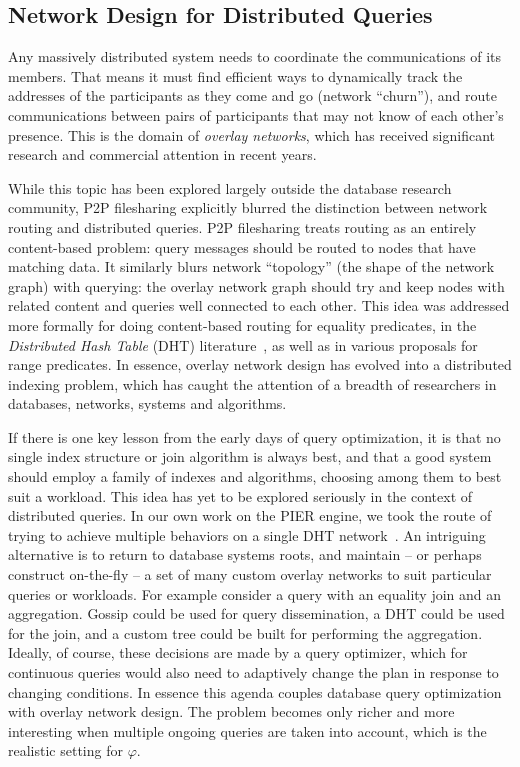 \documentclass{acm_proc_article-sp}
\def\philogo{{\large $\varphi$}\xspace}
\begin{document}
\subsection{Network Design for Distributed Queries} Any massively distributed system needs to coordinate the communications of its members. That means it must find efficient ways to dynamically track the addresses of the participants as they come and go (network ``churn''), and route communications between pairs of participants that may not know of each other's presence. This is the domain of {\em overlay networks}, which has received significant research and commercial attention in recent years.

While this topic has been explored largely outside the database research
community, P2P filesharing explicitly blurred the distinction between
network routing and distributed queries. P2P filesharing treats routing
as an entirely content-based problem: query messages should be routed to
nodes that have matching data. It similarly blurs network ``topology''
(the shape of the network graph) with querying: the overlay network
graph should try and keep nodes with related content and queries well
connected to each other. This idea was addressed more formally for doing
content-based routing for equality predicates, in the {\em Distributed
  Hash Table} (DHT) literature~\cite{Stoica2003,CAN,Bamboo}, as well as in various proposals for range predicates. In essence, overlay network design has evolved into a distributed indexing problem, which has caught the attention of a breadth of researchers in databases, networks, systems and algorithms.

If there is one key lesson from the early days of query optimization, it is that no single index structure or join algorithm is always best, and that a good system should employ a family of indexes and algorithms, choosing among them to best suit a workload. This idea has yet to be explored seriously in the context of distributed queries. In our own work on the PIER engine, we took the route of trying to achieve multiple behaviors on a single DHT network~\cite{pier-cidr}. An intriguing alternative is to return to database systems roots, and maintain -- or perhaps construct on-the-fly -- a set of many custom overlay networks to suit particular queries or workloads. For example consider a query with an equality join and an aggregation. Gossip could be used for query dissemination, a DHT could be used for the join, and a custom tree could be built for performing the aggregation. Ideally, of course, these decisions are made by a query optimizer, which for continuous queries would also need to adaptively change the plan in response to changing conditions. In essence this agenda couples database query optimization with overlay network design. The problem becomes only richer and more interesting when multiple ongoing queries are taken into account, which is the realistic setting for \philogo.
\end{document}
